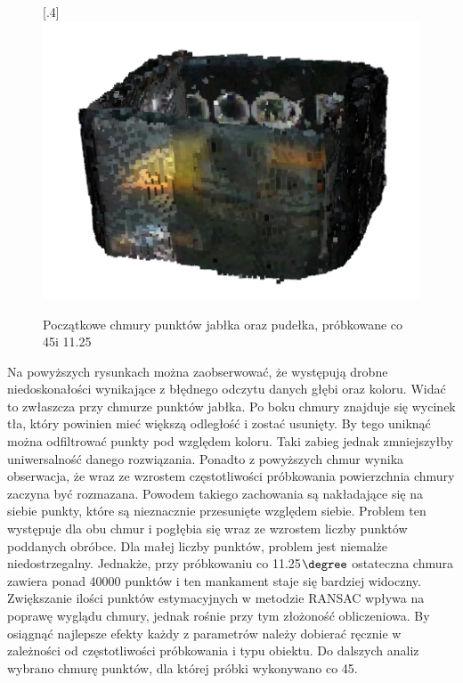 \begin{figure}[H]
  [.4\linewidth]{\includegraphics[scale=0.62]{box_global_1125_pt.PNG}}
\caption{Początkowe chmury punktów jabłka oraz pudełka, próbkowane co 45\degree i 11.25\degree}\label{fig:globalInitialCloudsAppleBox}
\end{figure}

Na powyższych rysunkach można zaobserwować, że występują drobne niedoskonałości wynikające z błędnego odczytu danych głębi oraz koloru. Widać to zwłaszcza przy chmurze punktów jabłka. Po boku chmury znajduje się wycinek tła, który powinien mieć większą odległość i zostać usunięty. By tego uniknąć można odfiltrować punkty pod względem koloru. Taki zabieg jednak zmniejszyłby uniwersalność danego rozwiązania.
\newline \indent Ponadto z powyższych chmur wynika obserwacja, że wraz ze wzrostem częstotliwości próbkowania powierzchnia chmury zaczyna być rozmazana. Powodem takiego zachowania są nakładające się na siebie punkty, które są nieznacznie przesunięte względem siebie. Problem ten występuje dla obu chmur i pogłębia się wraz ze wzrostem liczby punktów poddanych obróbce. Dla małej liczby punktów, problem jest niemalże niedostrzegalny. Jednakże, przy próbkowaniu co 11.25$\degree$ ostateczna chmura zawiera ponad 40000 punktów i ten mankament staje się bardziej widoczny.
 \newline \indent Zwiększanie ilości punktów estymacyjnych w metodzie RANSAC wpływa na poprawę wyglądu chmury, jednak rośnie przy tym złożoność obliczeniowa. By osiągnąć najlepsze efekty każdy z parametrów należy dobierać ręcznie w zależności od częstotliwości próbkowania i typu obiektu. Do dalszych analiz wybrano chmurę punktów, dla której próbki wykonywano co 45\degree.

